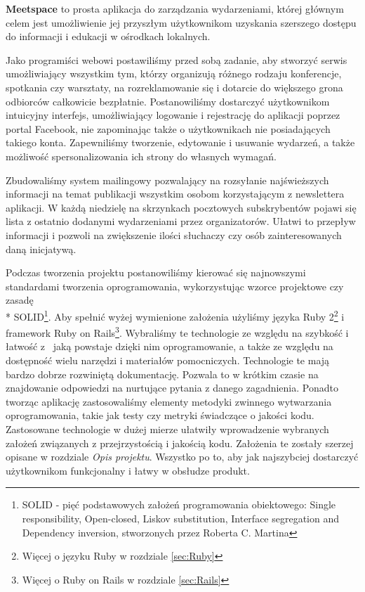 \textbf{Meetspace} to prosta aplikacja do zarządzania wydarzeniami, której głównym celem jest umożliwienie jej przyszłym użytkownikom uzyskania szerszego dostępu do informacji i edukacji w ośrodkach lokalnych.


Jako programiści webowi postawiliśmy przed sobą zadanie, aby stworzyć serwis umożliwiający wszystkim tym, którzy organizują różnego rodzaju konferencje, spotkania czy warsztaty, na rozreklamowanie się i dotarcie do większego grona odbiorców całkowicie bezpłatnie.
Postanowiliśmy dostarczyć użytkownikom intuicyjny interfejs, umożliwiający logowanie i rejestrację do aplikacji poprzez portal Facebook, nie zapominając także o użytkownikach nie posiadających takiego konta. Zapewniliśmy tworzenie, edytowanie i usuwanie wydarzeń, a także
możliwość spersonalizowania ich strony do własnych wymagań.


Zbudowaliśmy system mailingowy pozwalający na rozsyłanie najświeższych informacji na temat publikacji wszystkim osobom korzystającym z newslettera aplikacji. W każdą niedzielę na skrzynkach pocztowych subskrybentów pojawi się lista z ostatnio dodanymi wydarzeniami przez organizatorów. Ułatwi to przepływ informacji i pozwoli na zwiększenie ilości słuchaczy czy osób zainteresowanych daną inicjatywą.

Podczas tworzenia projektu postanowiliśmy kierować się najnowszymi standardami tworzenia oprogramowania, wykorzystując wzorce projektowe czy zasadę \\* SOLID\footnote{SOLID - pięć podstawowych założeń programowania obiektowego: Single responsibility, Open-closed, Liskov substitution, Interface segregation and Dependency inversion, stworzonych przez Roberta C. Martina}. Aby spełnić wyżej wymienione założenia użyliśmy języka  Ruby 2\footnote{Więcej o języku Ruby w rozdziale \ref{sec:Ruby}} i framework  Ruby on Rails\footnote{Więcej o Ruby on Rails w rozdziale \ref{sec:Rails}}. Wybraliśmy te technologie ze względu na szybkość i łatwość z~ jaką powstaje dzięki nim oprogramowanie, a także ze względu na dostępność wielu narzędzi i materiałów pomocniczych. Technologie te mają bardzo dobrze rozwiniętą dokumentację. Pozwala to w krótkim czasie na znajdowanie odpowiedzi na nurtujące pytania z danego zagadnienia. Ponadto tworząc aplikację zastosowaliśmy elementy metodyki zwinnego wytwarzania oprogramowania, takie jak testy czy metryki świadczące o jakości kodu. Zastosowane technologie w dużej mierze ułatwiły wprowadzenie wybranych założeń związanych z przejrzystością i jakością kodu. Założenia te zostały szerzej opisane w rozdziale \emph{Opis projektu}.
Wszystko po to, aby jak najszybciej dostarczyć użytkownikom funkcjonalny i łatwy w obsłudze produkt.
